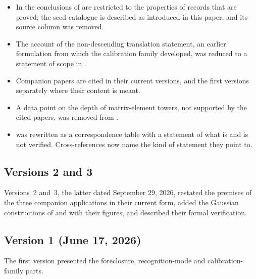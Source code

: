 \begin{itemize}
    general.
  \item In  the conclusions of
    are restricted to the properties of records that are proved; the
    seed catalogue is described as introduced in this paper, and its
    source column was removed.
    \item The account of the non-descending translation statement, an
    earlier formulation from which the calibration family developed,
    was reduced to a statement of scope in .
  \item Companion papers are cited in their current versions, and the
    first versions separately where their content is meant.
  \item A data point on the depth of matrix-element towers, not
    supported by the cited papers, was removed from
    .
    \item {} was rewritten as a correspondence
    table with a statement of what is and is not verified.
    Cross-references now name the kind of statement they point to.
\end{itemize}

\subsection*{Versions 2 and 3}
Versions~2 and~3, the latter dated September 29, 2026, restated the
premises of the three companion applications in their current form,
added the Gaussian constructions of  and
 with their figures, and described their formal
verification.

\subsection*{Version 1 (June 17, 2026)}
The first version presented the foreclosure, recognition-mode and
calibration-family parts.
\par\endgroup
